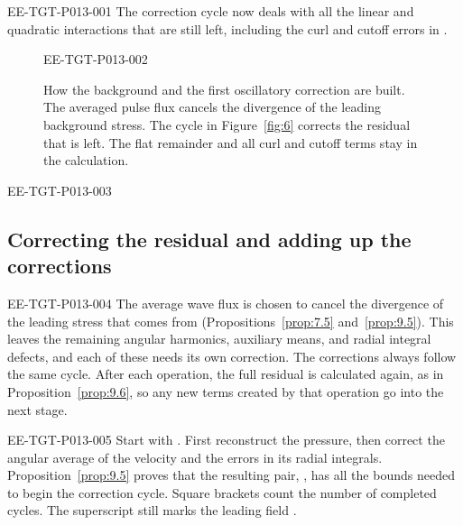 %
\begin{EESegment}{EE-TGT-P013-001}
The correction cycle now deals with all the linear and quadratic interactions that are still
left, including the curl and cutoff errors in
.
\end{EESegment}

\begin{figure}[htbp]
  \centering
  \begin{EESegment}{EE-TGT-P013-002}
  \caption{How the background and the first oscillatory correction are built.
  The averaged pulse flux cancels the divergence of the leading background stress.
  The cycle in Figure~\ref{fig:6} corrects the residual that is left. The flat remainder
  and all curl and cutoff terms stay in the calculation.}
  \label{fig:5}
  \end{EESegment}
\end{figure}

\begin{EESegment}{EE-TGT-P013-003}
\subsection{Correcting the residual and adding up the corrections}\label{sec:3.4}
\end{EESegment}

\begin{EESegment}{EE-TGT-P013-004}
The average wave flux is chosen to cancel the divergence of the leading stress that comes
from  (Propositions~\ref{prop:7.5} and~\ref{prop:9.5}). This leaves the
remaining angular harmonics, auxiliary means, and radial integral defects, and each
of these needs its own correction. The corrections always follow the same cycle. After each
operation, the full residual is calculated again, as in Proposition~\ref{prop:9.6}, so any
new terms created by that operation go into the next stage.
\end{EESegment}

\begin{EESegment}{EE-TGT-P013-005}
Start with . First reconstruct the pressure, then correct
the angular average of the velocity and the errors in its radial integrals.
Proposition~\ref{prop:9.5} proves that the resulting pair,
, has all the bounds needed to begin the correction
cycle. Square brackets count the number of completed cycles. The superscript
 still marks the leading field
.
\end{EESegment}

